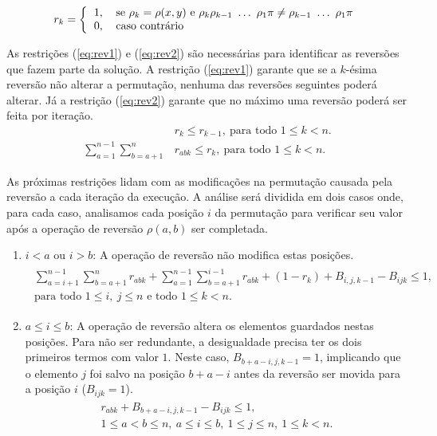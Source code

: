 \[
r_{k} = \left \{ 
\begin{tabular}{ll} 
 1, & se $\rho_{k} = \rho(x,y)$ e
 $\rho_{k} \rho_{k-1}~\ldots~\rho_{1} \pi \neq \rho_{k-1}~\ldots~\rho_{1} \pi$\\
 0, & caso contrário 
\end{tabular}
\right .
\]

As restrições (\ref{eq:rev1}) e (\ref{eq:rev2}) são necessárias para
identificar as reversões que fazem parte da solução. A restrição
(\ref{eq:rev1}) garante que se a $k$-ésima reversão não alterar a
permutação, nenhuma das reversões seguintes poderá alterar. Já a
restrição (\ref{eq:rev2}) garante que no máximo uma reversão poderá
ser feita por iteração.
\begin{align}
  &r_{k} \le r_{k-1},~\text{para todo $1 \le k <
  n$}. \label{eq:rev1} \\
  \sum_{a=1}^{n-1}\sum_{b=a+1}^{n}
  &r_{abk} \le r_{k},~\text{para todo $1 \le k < n$}. \label{eq:rev2}
\end{align}

As próximas restrições lidam com as modificações na permutação causada
pela reversão a cada iteração da execução. A análise será dividida em
dois casos onde, para cada caso, analisamos cada posição $i$ da
permutação para verificar seu valor após a operação de reversão
$\rho(a,b)$ ser completada.
\begin{enumerate}
\item{$i < a$ ou $i > b$:
A operação de reversão não modifica estas posições.
\begin{align}
  \begin{split}
    \sum_{a=i+1}^{n-1}\sum_{b=a+1}^{n} r_{abk} +
    \sum_{a=1}^{n-1}\sum_{b=a+1}^{i-1} r_{abk} +
    (1 - r_{k}) + B_{i,j,k-1} - B_{ijk} \le 1, \\
    \text{para todo $1 \le i,~j \le n$ e todo $1 \le k < n$}.
  \end{split}
  \label{eq:rev3}
\end{align}}
\item{$a \le i \le b$:
A operação de reversão altera os elementos guardados nestas
posições. Para não ser redundante, a desigualdade precisa ter os dois
primeiros termos com valor $1$. Neste caso, $B_{b+a-i,j,k-1} = 1$,
implicando que o elemento $j$ foi salvo na posição $b + a - i$ antes
da reversão ser movida para a posição $i$ ($B_{ijk} = 1$).
\begin{align}
  \begin{split}
  r_{abk} + B_{b+a-i,j,k-1} - B_{ijk} \le 1, \\
  \text{$1 \le a < b \le n,~a \le i \le b,~1 \le j
    \le n,~1 \le k < n$}.
  \end{split}
  \label{eq:rev4}
\end{align}}
\end{enumerate}


